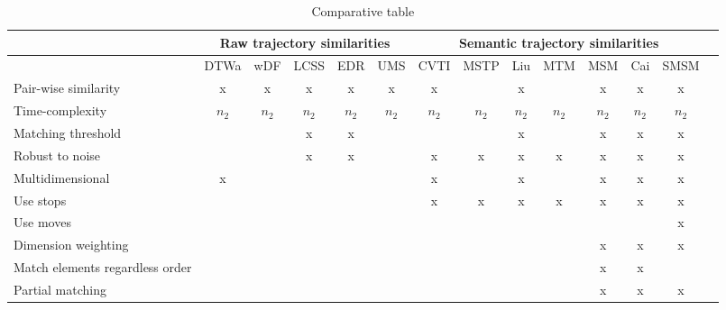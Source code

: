 \begin{landscape}
    \begingroup
        \setlength{\tabcolsep}{6pt} %
        \renewcommand{\arraystretch}{1.5} %
        \vspace*{\fill}
        \begin{table}[h!]
        \scriptsize
          \centering
          \begin{tabular}{|l|c|c|c|c|c|c|c|c|c|c|c|c|c|}
          	\hline
          	    & \multicolumn{5}{c|}{Raw trajectory similarities} & \multicolumn{7}{c|}{Semantic trajectory similarities}\\
          	\hline
        		& DTWa & wDF & LCSS & EDR & UMS & CVTI & MSTP & Liu & MTM & MSM & Cai & SMSM\\
          	\hline
             Pair-wise similarity & x & x & x & x & x & x &  & x &  & x & x & x \\
          	\hline
             Time-complexity & $n_2$ & $n_2$ & $n_2$ & $n_2$ & $n_2$ & $n_2$ & $n_2$ & $n_2$ & $n_2$ & $n_2$ & $n_2$ & $n_2$\\
          	\hline
             Matching threshold &  &  & x & x &  &  &  & x &  & x & x & x\\
          	\hline
             Robust to noise &  &  & x & x &  & x & x & x & x & x & x & x \\
          	\hline
             Multidimensional & x &  &  &  &  & x &  & x &  & x & x & x\\
          	\hline
             Use stops &  &  &  &  &  & x & x & x & x & x & x &x \\
          	\hline
             Use moves &  &  &  &  &  &  &  &  &  &  &  & x \\
          	\hline
             Dimension weighting &  &  &  &  &  &  &  &  &  & x & x & x \\
          	\hline
             Match elements regardless order &  &  &  &  &  &  &  &  &  & x & x & \\
          	\hline
             Partial matching &  &  &  &  &  &  &  &  &  & x & x & x\\
          	\hline
          \end{tabular}
          \caption{Comparative table}
          \label{tab:comparative_table}
        \end{table}
        \vspace*{\fill}
    \endgroup
\end{landscape}
